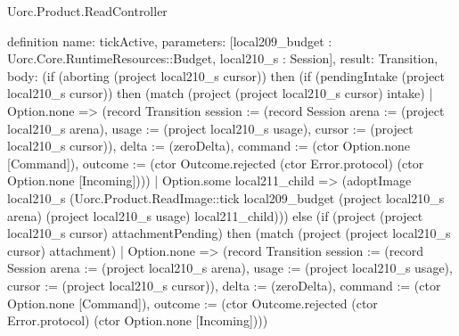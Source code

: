 \begin{lexlean}{Uorc.Product.ReadController}
\begin{semanticmodule}
definition{
  name: tickActive,
  parameters: [local209_budget : Uorc.Core.RuntimeResources::Budget, local210_s : Session],
  result: Transition,
  body: (if (aborting (project local210_s cursor)) then (if (pendingIntake (project local210_s cursor)) then (match (project (project local210_s cursor) intake)
    | Option.none => (record Transition {session := (record Session {arena := (project local210_s arena), usage := (project local210_s usage), cursor := (project local210_s cursor)}), delta := (zeroDelta), command := (ctor Option.none [Command]), outcome := (ctor Outcome.rejected (ctor Error.protocol) (ctor Option.none [Incoming]))})
    | Option.some local211_child => (adoptImage local210_s (Uorc.Product.ReadImage::tick local209_budget (project local210_s arena) (project local210_s usage) local211_child))) else (if (project (project local210_s cursor) attachmentPending) then (match (project (project local210_s cursor) attachment)
    | Option.none => (record Transition {session := (record Session {arena := (project local210_s arena), usage := (project local210_s usage), cursor := (project local210_s cursor)}), delta := (zeroDelta), command := (ctor Option.none [Command]), outcome := (ctor Outcome.rejected (ctor Error.protocol) (ctor Option.none [Incoming]))})
}
\end{semanticmodule}
\end{lexlean}
